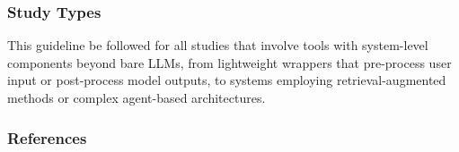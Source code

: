 \subsubsection{Study Types}

This guideline \must be followed for all studies that involve tools with system-level components beyond bare LLMs, from lightweight wrappers that pre-process user input or post-process model outputs, to systems employing retrieval-augmented methods or complex agent-based architectures.

\subsubsection{References}





